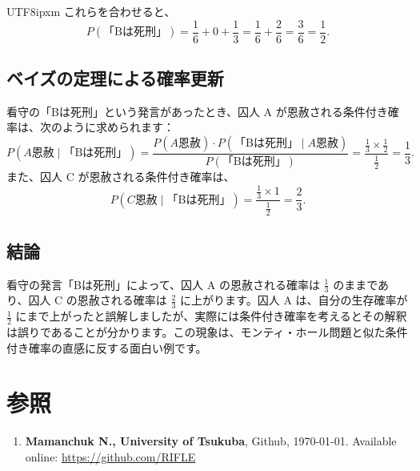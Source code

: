 \documentclass[12pt,a4paper]{article}
\begin{document}
\begin{CJK}{UTF8}{ipxm}
これらを合わせると、
\[
P(\text{「Bは死刑」}) = \frac{1}{6} + 0 + \frac{1}{3} = \frac{1}{6} + \frac{2}{6} = \frac{3}{6} = \frac{1}{2}.
\]

\subsection*{ベイズの定理による確率更新}
看守の「Bは死刑」という発言があったとき、囚人 A が恩赦される条件付き確率は、次のように求められます：
\[
P(A \text{恩赦} \mid \text{「Bは死刑」}) = \frac{P(A \text{恩赦}) \cdot P(\text{「Bは死刑」} \mid A \text{恩赦})}{P(\text{「Bは死刑」})} = \frac{\frac{1}{3} \times \frac{1}{2}}{\frac{1}{2}} = \frac{1}{3}.
\]
また、囚人 C が恩赦される条件付き確率は、
\[
P(C \text{恩赦} \mid \text{「Bは死刑」}) = \frac{\frac{1}{3} \times 1}{\frac{1}{2}} = \frac{2}{3}.
\]

\subsection*{結論}
看守の発言「Bは死刑」によって、囚人 A の恩赦される確率は $\frac{1}{3}$ のままであり、囚人 C の恩赦される確率は $\frac{2}{3}$ に上がります。囚人 A は、自分の生存確率が $\frac{1}{2}$ にまで上がったと誤解しましたが、実際には条件付き確率を考えるとその解釈は誤りであることが分かります。この現象は、モンティ・ホール問題と似た条件付き確率の直感に反する面白い例です。





\section*{参照}
\begin{enumerate}
    \item \textbf{Mamanchuk N., University of Tsukuba}, Github, \today. Available online: \url{https://github.com/RIFLE}
\end{enumerate}


\end{CJK}
\end{document}
